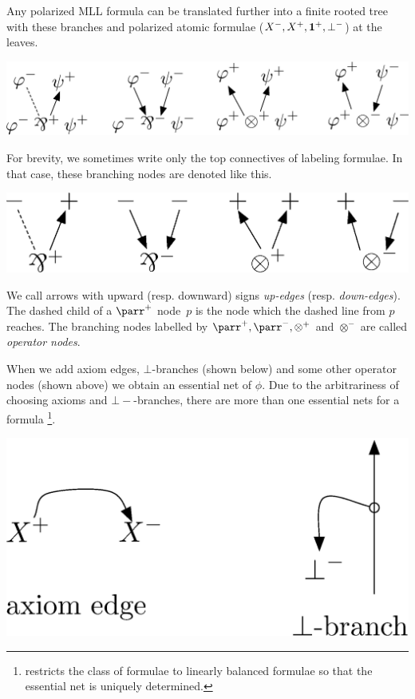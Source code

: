 Any polarized MLL formula can be translated further into
a finite rooted tree with these branches and polarized atomic formulae
($X^-, X^+, \mathbf{1}^+,\bot^-$) at the leaves.
 \begin{center}
  \includegraphics[scale=0.4]{rules-original.eps}
 \end{center}
For brevity, we sometimes write only the top connectives of labeling
formulae.
In that case, these branching nodes are denoted like this.
 \begin{center} %
  \includegraphics[scale=0.4]{rules.eps}
 \end{center}
We call arrows with upward (resp. downward) signs
\textit{up-edges}
(resp. \textit{down-edges}).
The dashed child of a $\parr^+$ node~$p$ is the node which the dashed
line from $p$ reaches.
The branching nodes labelled by $\parr^+, \parr^-, \otimes^+$ and
$\otimes^-$ are called \textit{operator nodes}.

When we add axiom edges, $\bot$-branches (shown below)
and some other operator nodes (shown above)
we obtain an
essential net of $\phi$.
Due to the arbitrariness of choosing axioms and $\bot-$-branches,
there are more than one essential nets for a formula%
\footnote{\citet{murawski2003} restricts the class of formulae to linearly balanced
formulae so that the essential net is uniquely determined.}.
 \begin{center}
  \includegraphics[scale=0.4]{axiom-cut.eps}
 \end{center}

